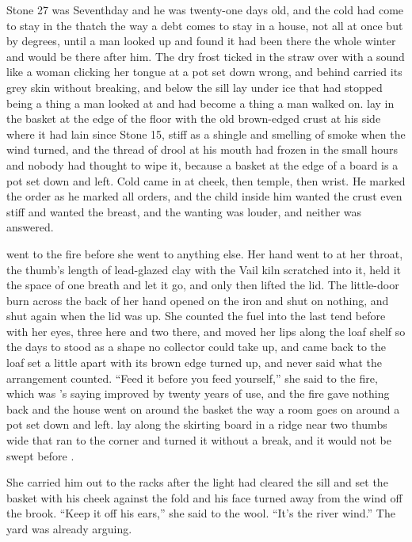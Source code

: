 
Stone 27 was Seventhday and he was twenty-one days old, and the cold had come to stay in the thatch the way a debt comes to stay in a house, not all at once but by degrees, until a man looked up and found it had been there the whole winter and would be there after him. The dry frost ticked in the straw over  with a sound like a woman clicking her tongue at a pot set down wrong, and  behind  carried its grey skin without breaking, and  below the sill lay under ice that had stopped being a thing a man looked at and had become a thing a man walked on.  lay in the basket at the edge of the floor with the old brown-edged crust at his side where it had lain since Stone 15, stiff as a shingle and smelling of smoke when the wind turned, and the thread of drool at his mouth had frozen in the small hours and nobody had thought to wipe it, because a basket at the edge of a board is a pot set down and left. Cold came in at cheek, then temple, then wrist. He marked the order as he marked all orders, and the child inside him wanted the crust even stiff and wanted the breast, and the wanting was louder, and neither was answered.

 went to the fire before she went to anything else. Her hand went to  at her throat, the thumb's length of lead-glazed clay with the Vail kiln scratched into it, held it the space of one breath and let it go, and only then lifted the lid. The little-door burn across the back of her hand opened on the iron and shut on nothing, and shut again when the lid was up. She counted the fuel into the last tend before  with her eyes, three here and two there, and moved her lips along the loaf shelf so the days to  stood as a shape no collector could take up, and came back to the loaf set a little apart with its brown edge turned up, and never said what the arrangement counted. “Feed it before you feed yourself,” she said to the fire, which was 's saying improved by twenty years of use, and the fire gave nothing back and the house went on around the basket the way a room goes on around a pot set down and left.  lay along the skirting board in a ridge near two thumbs wide that ran to the corner and turned it without a break, and it would not be swept before .

She carried him out to the racks after the light had cleared the sill and set the basket with his cheek against the fold and his face turned away from the wind off the brook. “Keep it off his ears,” she said to the wool. “It's the river wind.” The yard was already arguing.


